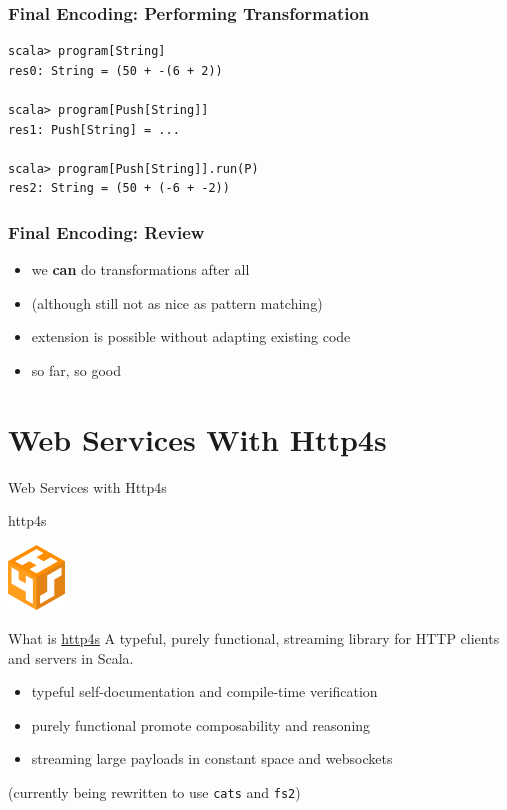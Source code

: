 \documentclass{beamer}
\begin{document}
\begin{frame}[fragile]
  \frametitle{Final Encoding: Performing Transformation}
\begin{verbatim}
scala> program[String]
res0: String = (50 + -(6 + 2))

scala> program[Push[String]]
res1: Push[String] = ...

scala> program[Push[String]].run(P)
res2: String = (50 + (-6 + -2))
\end{verbatim}
\end{frame}

\begin{frame}
  \frametitle{Final Encoding: Review}
  \begin{itemize}
  \item we \textbf{can} do transformations after all
  \item (although still not as nice as pattern matching)
  \item extension is possible without adapting existing code
  \item so far, so good
  \end{itemize}
\end{frame}

\section{Web Services With Http4s}

\begin{frame}
  \begin{center}
    \Huge Web Services with Http4s
  \end{center}
\end{frame}

\begin{frame}{http4s}
  \begin{center}
    \includegraphics[width=15mm]{../pics/http4s.png}
  \end{center}

  \begin{block}{What is \hyperlink{http://http4s.org/}{http4s}}
    A typeful, purely functional, streaming library for HTTP
    clients and servers in Scala.
  \end{block}
  \begin{itemize}
  \item typeful \textemdash{} self-documentation and compile-time verification
  \item purely functional \textemdash{} promote composability and reasoning
  \item streaming \textemdash{} large payloads in constant space and
    websockets
  \end{itemize}
  \begin{center}
    \alert{(currently being rewritten to use \texttt{cats} and \texttt{fs2})}
  \end{center}

\end{frame}
\end{document}
